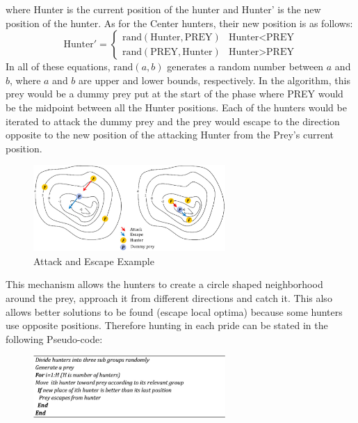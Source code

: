 where Hunter is the current position of the hunter and Hunter' is the new position of the hunter.
As for the Center hunters, their new position is as follows:
\[ \text{Hunter}' =  \begin{cases} 
      \text{rand}(\text{Hunter}, \text{PREY}) & \text{Hunter} < \text{PREY} \\
      \text{rand}(\text{PREY}, \text{Hunter}) & \text{Hunter} > \text{PREY}
   \end{cases}
\]
In all of these equations, $\text{rand}(a,b)$ generates a random number between $a$ and $b$, where $a$ and $b$ are upper and lower bounds, respectively.
In the algorithm, this prey would be a dummy prey put at the start of the phase where PREY would be the midpoint between all the Hunter positions. Each of the hunters would be iterated to attack the dummy prey and the prey would escape to the direction opposite to the new position of the attacking Hunter from the Prey's current position.
\begin{figure}[h]
\begin{center}
\includegraphics[width=0.65\textwidth]{img/pa/hunting_attack}
\caption{Attack and Escape Example}
\end{center}
\end{figure}
This mechanism allows the hunters to create a circle shaped neighborhood around the prey, approach it from different directions and catch it. This also allows better solutions to be found (escape local optima) because some hunters use opposite positions.
Therefore hunting in each pride can be stated in the following Pseudo-code:
\begin{figure}[h]
\begin{center}
\includegraphics[width=0.65\textwidth]{img/pa/hunting_pseudo}
\end{center}
\end{figure}

